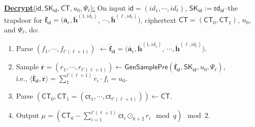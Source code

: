 \documentclass[runningheads]{llncs}
\begin{document}
\begin{description}
\begin{enumerate}
\end{enumerate}

\item \underline{\textbf{\textsf{Decrypt}}($\mathsf{id}, \mathsf{SK}_\mathsf{id},\overline{\mathsf{CT}},u_0, \Psi_\ell $):}
On input  $\mathsf{id}=(id_1, \cdots, id_\ell)$,   $\mathsf{SK}_\mathsf{id}:=\textsf{td}_\textsf{id}$--the trapdoor  for $ \overline{\mathbf{f}}_{\mathsf{id}}=(\overline{\mathbf{a}}_{\epsilon},   \overline{\mathbf{h}}^{(1,id_1)}$, $  \cdots,\overline{\mathbf{h}}^{(\ell,id_{\ell})})$, ciphertext $\overline{\mathsf{CT}}=(\mathsf{CT}_0, \mathsf{CT}_1)$, $u_0$, and $\Psi_\ell $,  do:

\begin{enumerate}
\item Parse  $(f_1, \cdots, f_{t'(\ell+1)}) $ $\leftarrow \overline{\mathbf{f}}_{\mathsf{id}}=(\overline{\mathbf{a}}_{\epsilon},   \overline{\mathbf{h}}^{(1,id_1)}$, $  \cdots,\overline{\mathbf{h}}^{(\ell,id_{\ell})})$.
\item Sample $\overline{\textbf{r}}=(r_1,\cdots, r_{t'(\ell+1)}) \leftarrow \mathsf{GenSamplePre}(\overline{\textbf{f}}_{\mathsf{id}}, \mathsf{SK}_\mathsf{id}, u_0,\Psi_\ell)$, \\i.e., $\langle \overline{\textbf{f}}_{\mathsf{id}}, \overline{\textbf{r}} \rangle =\sum_{1}^{t'(\ell+1)}r_i\cdot f_i=u_0$.
\item Parse $(\mathsf{CT}_0, \mathsf{CT}_1=(\textsf{ct}_1, \cdots, \textsf{ct}_{t'(\ell+1)})) \leftarrow \overline{\mathsf{CT}}$.
\item Output $\mu=(\mathsf{CT}_{0}-\sum_{i=1}^{t'(\ell+1)} \textsf{ct}_{i}\odot_{k+2} r_i \mod q) \mod 2$.
\end{enumerate}

\end{description}
\end{document}
